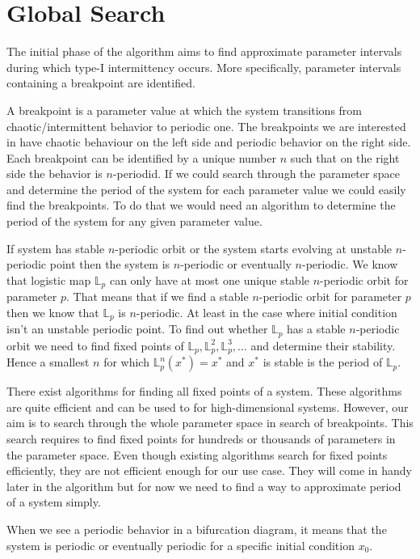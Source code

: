 \section{Global Search}
The initial phase of the algorithm aims to find approximate parameter intervals during which type-I intermittency occurs.
More specifically, parameter intervals containing a breakpoint are identified.
\par
A breakpoint is a parameter value at which the system transitions from chaotic/intermittent behavior to periodic one.
The breakpoints we are interested in have chaotic behaviour on the left side and periodic behavior on the right side.
Each breakpoint can be identified by a unique number $n$ such that on the right side the behavior is $n$-periodid.
If we could search through the parameter space and determine the period of the system for each parameter value we could easily find the breakpoints.
To do that we would need an algorithm to determine the period of the system for any given parameter value.
\par
If system has stable $n$-periodic orbit or the system starts evolving at unstable $n$-periodic point then the system is $n$-periodic or eventually $n$-periodic.
We know that logistic map $\mathbb{L}_p$ can only have at most one unique stable $n$-periodic orbit for parameter $p$.
That means that if we find a stable $n$-periodic orbit for parameter $p$ then we know that $\mathbb{L}_p$ is $n$-periodic.
At least in the case where initial condition isn't an unstable periodic point.
To find out whether $\mathbb{L}_p$ has a stable $n$-periodic orbit we need to find fixed points of $\mathbb{L}_p, \mathbb{L}_{p}^{2}, \mathbb{L}_{p}^{3}, \dots$ and determine their stability.
Hence a smallest $n$ for which $\mathbb{L}_{p}^{n}(x^{*})=x^{*}$ and $x^{*}$ is stable is the period of $\mathbb{L}_p$.
\par
There exist algorithms for finding all fixed points of a system.
These algorithms are quite efficient and can be used to for high-dimensional systems.
However, our aim is to search through the whole parameter space in search of breakpoints.
This search requires to find fixed points for hundreds or thousands of parameters in the parameter space.
Even though existing algorithms search for fixed points efficiently, they are not efficient enough for our use case.
They will come in handy later in the algorithm but for now we need to find a way to approximate period of a system simply.
\par
When we see a periodic behavior in a bifurcation diagram, it means that the system is periodic or eventually periodic for a specific initial condition $x_0$.
